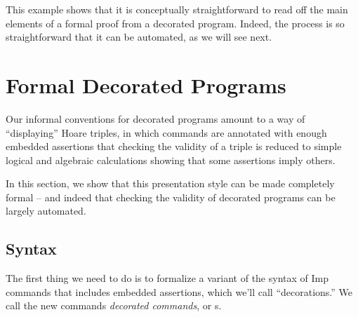 \documentclass[12pt]{report}
\begin{document}
This example shows that it is conceptually straightforward to read
    off the main elements of a formal proof from a decorated program.
    Indeed, the process is so straightforward that it can be
    automated, as we will see next. 
\begin{coqdoccode}
\coqdocemptyline
\end{coqdoccode}
\section{Formal Decorated Programs}



 Our informal conventions for decorated programs amount to a
    way of ``displaying'' Hoare triples, in which commands are annotated
    with enough embedded assertions that checking the validity of a
    triple is reduced to simple logical and algebraic calculations
    showing that some assertions imply others.


    In this section, we show that this presentation style can be made
    completely formal -- and indeed that checking the validity of
    decorated programs can be largely automated.  
\begin{coqdoccode}
\coqdocemptyline
\end{coqdoccode}
\subsection{Syntax}



 The first thing we need to do is to formalize a variant of the
    syntax of Imp commands that includes embedded assertions, which
    we'll call ``decorations.''  We call the new commands \textit{decorated
    commands}, or s.
\end{document}
